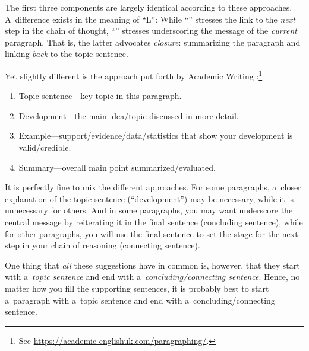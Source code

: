 \documentclass[12pt, a4paper, oneside]{article}
\renewcommand{\caps}[1]{{\textscale{0.97}{\textls[50]{\MakeUppercase{#1}}}}}
\theoremstyle{Plain}
\theoremstyle{Definition}
\theoremstyle{Remark}
\begin{document}
The first three components are largely identical according to these approaches. A~difference exists in the meaning of ``L'': While ``\caps{PEEL}'' stresses the link to the \emph{next} step in the chain of thought, ``\caps{MEAL}'' stresses underscoring the message of the \emph{current} paragraph. That is, the latter advocates \emph{closure}: summarizing the paragraph and linking \emph{back} to the topic sentence.

Yet slightly different is the approach put forth by Academic Writing \caps{UK}:\footnote{See \url{https://academic-englishuk.com/paragraphing/}.}
\begin{enumerate}
	\item Topic sentence---key topic in this paragraph.
	\item Development---the main idea\slash topic discussed in more detail.
	\item Example---support\slash evidence\slash data\slash statistics that show your development is valid\slash credible.
	\item Summary---overall main point summarized\slash evaluated.
\end{enumerate}

It is perfectly fine to mix the different approaches. For some paragraphs, a~closer explanation of the topic sentence (``development'') may be necessary, while it is unnecessary for others. And in some paragraphs, you may want underscore the central message by reiterating it in the final sentence (concluding sentence), while for other paragraphs, you will use the final sentence to set the stage for the next step in your chain of reasoning (connecting sentence).

One thing that \emph{all} these suggestions have in common is, however, that they start with a~\emph{topic sentence} and end with a~\emph{concluding\slash connecting sentence}. Hence, no matter how you fill the supporting sentences, it is probably best to start a~paragraph with a~topic sentence and end with a~concluding\slash connecting sentence.
\end{document}
